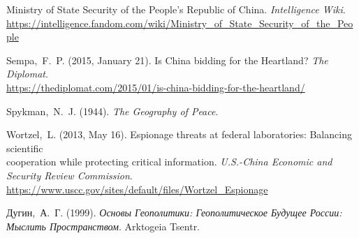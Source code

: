 \documentclass[12pt]{article}
\begin{document}
\begin{flushleft}
  Ministry of State Security of the People's Republic of China. \textit{Intelligence Wiki}.\\\hspace{.5 in}  \href{https://intelligence.fandom.com/wiki/Ministry\_of\_State\_Security\_of\_the\_People\%27s\_Republic\_of\_China}{https://intelligence.fandom.com/wiki/Ministry\_of\_State\_Security\_of\_the\_People}\\
  \vspace{5pt}

  Sempa, F. P. (2015, January 21). Is China bidding for the Heartland? \textit{The Diplomat}.\\\hspace{.5 in} \href{https://thediplomat.com/2015/01/is-china-bidding-for-the-heartland/}{https://thediplomat.com/2015/01/is-china-bidding-for-the-heartland/}\\
  \vspace{5pt}

  Spykman, N. J. (1944). \textit{The Geography of Peace}.\\
  \vspace{5pt}

  Wortzel, L. (2013, May 16). Espionage threats at federal laboratories: Balancing scientific\\\hspace{.5 in} cooperation while protecting critical information. \textit{U.S.-China Economic and \\\hspace{.5 in}Security Review Commission}. \\\hspace{.5 in} \href{https://www.uscc.gov/sites/default/files/Wortzel\_Espionage\%20Threat\%20at\%20Federal\%20Laboratories05.16.13.pdf}{https://www.uscc.gov/sites/default/files/Wortzel\_Espionage}\\
  \vspace{5pt}

  Дугин, А. Г. (1999). \textit{Основы Геополитики: Геополитическое Будущее России:\\\hspace{.5 in} Мыслить Пространством}. Arktogeia Tsentr.

\end{flushleft}
\end{document}
